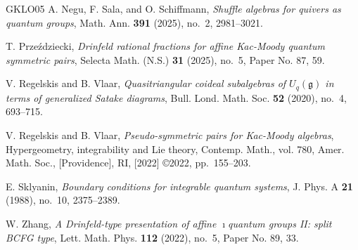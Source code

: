 \documentclass[reqno]{amsart}
\numberwithin{equation}{section}
\begin{document}
\begin{thebibliography}{GKLO05}
A. Negu{}, F. Sala, and O. Schiffmann, \emph{Shuffle
	algebras for quivers as quantum groups}, Math. Ann. \textbf{391} (2025),
no.~2, 2981--3021.

T. Prze\'zdziecki, \emph{Drinfeld rational fractions for affine
	{K}ac-{M}oody quantum symmetric pairs}, Selecta Math. (N.S.) \textbf{31}
(2025), no.~5, Paper No. 87, 59. 

V. Regelskis and B. Vlaar, \emph{Quasitriangular coideal subalgebras of
	{$U_q(\mathfrak g)$} in terms of generalized {S}atake diagrams}, Bull. Lond.
Math. Soc. \textbf{52} (2020), no.~4, 693--715. 

V. Regelskis and B. Vlaar, \emph{Pseudo-symmetric pairs for {K}ac-{M}oody algebras},
Hypergeometry, integrability and {L}ie theory, Contemp. Math., vol. 780,
Amer. Math. Soc., [Providence], RI, [2022] \copyright 2022, pp.~155--203.

E. Sklyanin, \emph{Boundary conditions for integrable quantum systems}, J.
Phys. A \textbf{21} (1988), no.~10, 2375--2389.

W. Zhang, \emph{A {D}rinfeld-type presentation of affine {$\imath$}quantum
	groups {II}: split {BCFG} type}, Lett. Math. Phys. \textbf{112} (2022),
no.~5, Paper No. 89, 33. 

\end{thebibliography}
\end{document}
